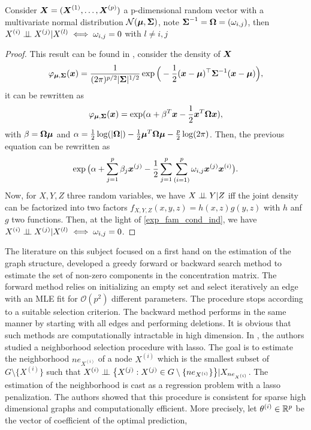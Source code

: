 \begin{lemma}
Consider $\boldsymbol X=(\boldsymbol X^{(1)},\dots,\boldsymbol X^{(p)})$ a p-dimensional random vector with a multivariate normal distribution $\mathcal N(\boldsymbol\mu, \boldsymbol\Sigma)$, note $\boldsymbol\Sigma^{-1}=\boldsymbol\Omega=(\omega_{i,j})$, then $X^{(i)} \perp\!\!\!\perp X^{(j)}|X^{(l)} \iff \omega_{i,j}=0$ with $l\neq i,j$ 
\end{lemma}
\begin{proof}
This result can be found in \citep{edwards2000introduction}, consider the density of $\boldsymbol X$
\begin{equation}
  \varphi_{\boldsymbol\mu,\boldsymbol\Sigma}(\boldsymbol x)=\frac{1}{(2\pi)^{p/2}|\boldsymbol\Sigma|^{1/2}} \exp\Big(-\frac{1}{2}(\boldsymbol x-\boldsymbol\mu)^\top\boldsymbol\Sigma^{-1}(\boldsymbol x-\boldsymbol\mu)\Big),
\end{equation}
it can be rewritten as
\begin{equation}
  \varphi_{\boldsymbol\mu,\boldsymbol\Sigma}(\boldsymbol x) = \exp(\alpha + \beta^T\boldsymbol x-\frac{1}{2}\boldsymbol x^T\boldsymbol\Omega\boldsymbol x),
\end{equation}
with $\beta=\boldsymbol\Omega\boldsymbol\mu$ and $\alpha=\frac{1}{2}\log(|\boldsymbol\Omega|)-\frac{1}{2}\boldsymbol\mu^T\boldsymbol\Omega\boldsymbol\mu-\frac{p}{2}\log(2\pi)$. Then, the previous equation can be rewritten as 
\begin{equation}
\label{exp_fam_cond_ind}
  \exp\big(\alpha + \sum_{j=1}^p\beta_j\boldsymbol x^{(j)}-\frac{1}{2}\sum_{j=1}^p\sum_{(i=1)}^p\omega_{i,j}\boldsymbol x^{(j)}\boldsymbol x^{(i)}\big).
\end{equation}
Now, for $X,Y,Z$ three random variables, we have $X \perp\!\!\!\perp Y|Z$ iff the joint density can be factorized into two factors $f_{X,Y,Z}(x,y,z)=h(x,z)g(y,z)$ with $h$ anf $g$ two functions. Then, at the light of  \cref{exp_fam_cond_ind}, we have $X^{(i)}\perp\!\!\!\perp X^{(j)}|X^{(l)} \iff \omega_{i,j}=0$.
\end{proof}
The literature on this subject focused on a first hand on the estimation of the graph structure, \citep{dempster1972cov_select} developed a greedy forward or backward search method to estimate the set of non-zero components in the concentration matrix. The forward method relies on initializing an empty set and select iteratively an edge with an MLE fit for $\mathcal{O}(p^2)$ different parameters. The procedure stops according to a suitable selection criterion. The backward method performs in the same manner by starting with all edges and performing deletions. It is obvious that such methods are computationally intractable in high dimension. In \citep{meinshausen2006}, the authors studied a neighborhood selection procedure with lasso. The goal is to estimate the neighborhood $ne_{X^{(i)}}$ of a node $X^{(i)}$ which is the smallest subset of $G\setminus\{X^{(i)}\}$ such that $X^{(i)} \perp\!\!\!\perp \big\{X^{(j)}: X^{(j)}\in G\setminus\{ne_{X^{(i)}}\}\big\} | X_{ne_{X^{(i)}}}$. The estimation of the neighborhood is cast as a regression problem with a lasso penalization. The authors showed that this procedure is consistent for sparse high dimensional graphs and computationally efficient. More precisely, let $\theta^{(i)} \in {\mathbb R} ^p$ be the vector of coefficient of the optimal prediction,
